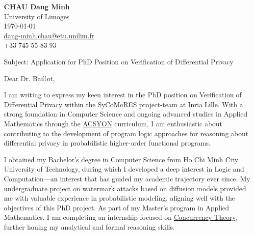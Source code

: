\documentclass[11pt]{report}
\begin{document}
\begin{titlepage}


    \begin{minipage}[t]{0.95\textwidth}
        \hfill
        \raggedleft
        \textbf{CHAU Dang Minh} \\
        University of Limoges \\
        \today\\
        \href{mailto:dang-minh.chau@etu.unilim.fr}{dang-minh.chau@etu.unilim.fr} \\
        +33 745 55 83 93 \\
    \end{minipage}

    \vspace{0.7em}

    \raggedright Subject: Application for PhD Position on Verification of Differential Privacy

    \vspace{0.7em}

    Dear Dr. Baillot,

    \vspace{0.7em}

    I am writing to express my keen interest in the PhD position on Verification of Differential Privacy within the SyCoMoRES project-team at Inria Lille. With a strong foundation in Computer Science and ongoing advanced studies in Applied Mathematics through the \href{https://www.unilim.fr/acsyon/}{ACSYON} curriculum, I am enthusiastic about contributing to the development of program logic approaches for reasoning about differential privacy in probabilistic higher-order functional programs.

    \vspace{0.7em}

    I obtained my Bachelor's degree in Computer Science from Ho Chi Minh City University of Technology, during which I developed a deep interest in Logic and Computation---an interest that has guided my academic trajectory ever since. My undergraduate project on watermark attacks based on diffusion models provided me with valuable experience in probabilistic modeling, aligning well with the objectives of this PhD project. As part of my Master’s program in Applied Mathematics, I am completing an internship focused on \href{https://www.telecom-paris.fr/wp-content-EvDsK19/uploads/2023/12/Master-Internship_Ameur-Boulifa-Ramea_Open-Automata.pdf}{Concurrency Theory}, further honing my analytical and formal reasoning skills.


\end{titlepage}
\end{document}
